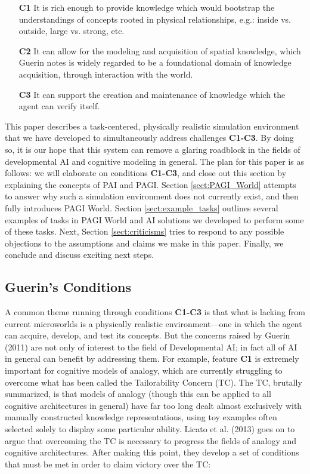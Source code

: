 \begin{itemize}

\item[\textbf{C1}] It is rich enough to provide knowledge which would bootstrap the understandings of concepts rooted in physical relationships, e.g.: inside vs. outside, large vs. strong, etc.

\item[\textbf{C2}] It can allow for the modeling and acquisition of spatial knowledge, which Guerin notes is widely regarded to be a foundational domain of knowledge acquisition, through interaction with the world.

\item[\textbf{C3}] It can support the creation and maintenance of knowledge which the agent can verify itself.

\end{itemize}

This paper describes a task-centered, physically realistic simulation environment that we have developed to simultaneously address challenges \textbf{C1-C3}. By doing so, it is our hope that this system can remove a glaring roadblock in the fields of developmental AI and cognitive modeling in general. The plan for this paper is as follows: we will elaborate on conditions \textbf{C1-C3}, and close out this section by explaining the concepts of PAI and PAGI. Section \ref{sect:PAGI_World} attempts to answer why such a simulation environment does not currently exist, and then fully introduces PAGI World. Section \ref{sect:example_tasks} outlines several examples of tasks in PAGI World and AI solutions we developed to perform some of these tasks. Next, Section \ref{sect:criticisms} tries to respond to any possible objections to the assumptions and claims we make in this paper. Finally, we conclude and discuss exciting next steps.

\subsection{Guerin's Conditions}

A common theme running through conditions \textbf{C1-C3} is that what is lacking from current microworlds is a physically realistic environment---one in which the agent can acquire, develop, and test its concepts. But the concerns raised by Guerin (2011) are not only of interest to the field of Developmental AI; in fact all of AI in general can benefit by addressing them. For example, feature \textbf{C1} is extremely important for cognitive models of analogy, which are currently struggling to overcome what has been called the Tailorability Concern (TC)\cite{Gentner2011,Licato2013b}. The TC, brutally summarized, is that models of analogy (though this can be applied to all cognitive architectures in general) have far too long dealt almost exclusively with manually constructed knowledge representations, using toy examples often selected solely to display some particular ability. Licato et al. (2013) goes on to argue that overcoming the TC is necessary to progress the fields of analogy and cognitive architectures. After making this point, they develop a set of conditions that must be met in order to claim victory over the TC:

